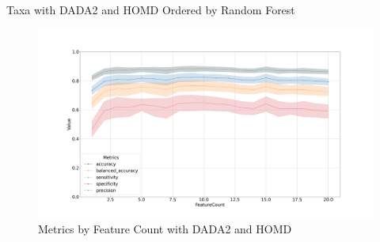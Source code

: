 \documentclass[a4paper]{article}
\begin{document}
            \begin{table}[p]
                \centering
                \caption{Taxa with DADA2 and HOMD Ordered by Random Forest}
                \label{tb:RF-every-DADA2-homd}

            \end{table}

            \begin{figure}[p]
                \centering
                \includegraphics[width=0.7 \linewidth]{figures/RandomForest/ANCOM.DADA2.homd/metrics.png}
                \caption{Metrics by Feature Count with DADA2 and HOMD}
                \label{fig:RF-every-metrics-DADA2-homd}
            \end{figure}
\end{document}
